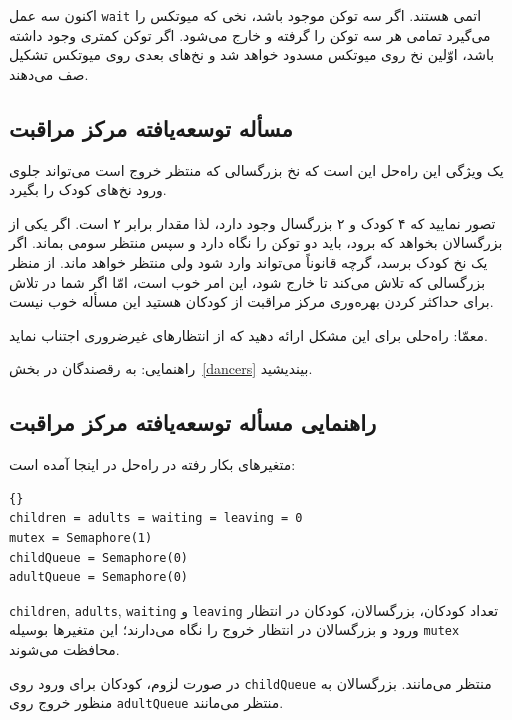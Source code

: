 \documentclass{book}
\newcommand{\clearemptydoublepage}{\newpage\cleardoublepage}
\begin{document}
    اکنون سه عمل {\tt wait} اتمی هستند. اگر سه توکن موجود باشد، نخی که میوتکس را می‌گیرد تمامی هر سه توکن را گرفته و خارج می‌شود. 
    اگر  توکن کمتری وجود داشته باشد، اوّلین نخ روی میوتکس مسدود خواهد شد و نخ‌های بعدی روی میوتکس تشکیل صف می‌دهند. 

\subsection {مسأله توسعه‌یافته مرکز مراقبت}

    یک ویژگی این راه‌حل این است که نخ بزرگسالی که منتظر خروج است می‌تواند جلوی ورود نخ‌های کودک را بگیرد. 

    تصور نمایید که ۴ کودک و ۲ بزرگسال وجود دارد، لذا مقدار  برابر ۲ است. اگر یکی از بزرگسالان بخواهد که برود، باید دو توکن 
    را نگاه دارد و سپس منتظر سومی بماند. اگر یک نخ کودک برسد، گرچه قانوناً می‌تواند وارد شود ولی منتظر خواهد ماند. 
    از منظر بزرگسالی که تلاش می‌کند تا خارج شود، این امر خوب است، امّا اگر شما در تلاش برای حداکثر کردن بهره‌وری مرکز مراقبت از کودکان هستید 
    این مسأله خوب نیست. 

    معمّا: راه‌حلی برای این مشکل ارائه دهید که از انتظارهای غیرضروری اجتناب نماید. 

    راهنمایی: به رقصندگان در بخش~\ref{dancers} بیندیشید. 



\clearemptydoublepage
\subsection {راهنمایی مسأله توسعه‌یافته مرکز مراقبت}

    متغیرهای بکار رفته در راه‌حل در اینجا آمده است:

\begin{latin}
\begin{lstlisting}[title=\rl{راهنمایی مسأله توسعه‌یافته مرکز مراقبت}]{}
children = adults = waiting = leaving = 0
mutex = Semaphore(1)
childQueue = Semaphore(0)
adultQueue = Semaphore(0)
\end{lstlisting}
\end{latin}

{\tt children}, {\tt adults}, {\tt waiting} و {\tt leaving}
    تعداد کودکان، بزرگسالان، کودکان در انتظار ورود و بزرگسالان در انتظار خروج را نگاه می‌دارند؛ این متغیرها بوسیله {\tt mutex} محافظت می‌شوند. 

    در صورت لزوم،  کودکان  برای ورود  روی {\tt childQueue}  منتظر می‌مانند. 
    بزرگسالان به منظور خروج روی  {\tt adultQueue}  منتظر می‌مانند. 
\end{document}
